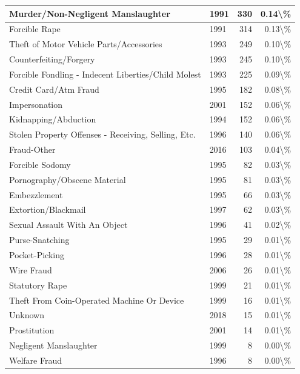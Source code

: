 \documentclass[
]{krantz}
\begin{document}
\begin{longtable}[t]{l|l|r|r}
\hline
Murder/Non-Negligent Manslaughter & 1991 & 330 & 0.14\textbackslash{}\%\\
\hline
Forcible Rape & 1991 & 314 & 0.13\textbackslash{}\%\\
\hline
Theft of Motor Vehicle Parts/Accessories & 1993 & 249 & 0.10\textbackslash{}\%\\
\hline
Counterfeiting/Forgery & 1993 & 245 & 0.10\textbackslash{}\%\\
\hline
Forcible Fondling - Indecent Liberties/Child Molest & 1993 & 225 & 0.09\textbackslash{}\%\\
\hline
Credit Card/Atm Fraud & 1995 & 182 & 0.08\textbackslash{}\%\\
\hline
Impersonation & 2001 & 152 & 0.06\textbackslash{}\%\\
\hline
Kidnapping/Abduction & 1994 & 152 & 0.06\textbackslash{}\%\\
\hline
Stolen Property Offenses - Receiving, Selling, Etc. & 1996 & 140 & 0.06\textbackslash{}\%\\
\hline
Fraud-Other & 2016 & 103 & 0.04\textbackslash{}\%\\
\hline
Forcible Sodomy & 1995 & 82 & 0.03\textbackslash{}\%\\
\hline
Pornography/Obscene Material & 1995 & 81 & 0.03\textbackslash{}\%\\
\hline
Embezzlement & 1995 & 66 & 0.03\textbackslash{}\%\\
\hline
Extortion/Blackmail & 1997 & 62 & 0.03\textbackslash{}\%\\
\hline
Sexual Assault With An Object & 1996 & 41 & 0.02\textbackslash{}\%\\
\hline
Purse-Snatching & 1995 & 29 & 0.01\textbackslash{}\%\\
\hline
Pocket-Picking & 1996 & 28 & 0.01\textbackslash{}\%\\
\hline
Wire Fraud & 2006 & 26 & 0.01\textbackslash{}\%\\
\hline
Statutory Rape & 1999 & 21 & 0.01\textbackslash{}\%\\
\hline
Theft From Coin-Operated Machine Or Device & 1999 & 16 & 0.01\textbackslash{}\%\\
\hline
Unknown & 2018 & 15 & 0.01\textbackslash{}\%\\
\hline
Prostitution & 2001 & 14 & 0.01\textbackslash{}\%\\
\hline
Negligent Manslaughter & 1999 & 8 & 0.00\textbackslash{}\%\\
\hline
Welfare Fraud & 1996 & 8 & 0.00\textbackslash{}\%\\

\end{longtable}
\end{document}
